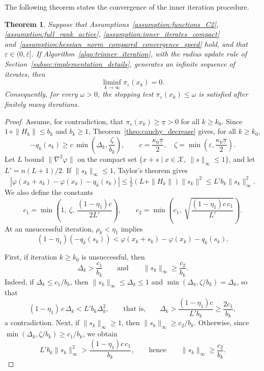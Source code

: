 \documentclass{article}
\numberwithin{equation}{section}
\newcommand{\calX}{{\mathcal{X}}}
\newcommand{\rev}[1]{#1}
\theoremstyle{plain}
\newtheorem{theorem}{Theorem}
\begin{document}
The following theorem states the convergence of the inner \rev{iteration} procedure.
\begin{theorem}\label{theo:inner_convergence}
	Suppose that Assumptions~\ref{assumption:functions_C2}, \ref{assumption:full_rank_active}, \ref{assumption:inner_iterates_compact} and~\ref{assumption:hessian_norm_compared_convergence_speed} hold, and that $\varepsilon \in (0,\bar\varepsilon]$. If Algorithm~\ref{algo:trinner_iteration}\rev{, with the radius update rule of Section~\ref{subsec:implementation_details},} generates an infinite sequence of iterates, then
	\[\liminf_{k\to\infty} \pi_\varepsilon(x_k) = 0.\]
	Consequently, for every $\omega > 0$, the stopping test $\pi_\varepsilon(x_k) \le \omega$ is satisfied after finitely many iterations.
\end{theorem}
\begin{proof}
	Assume, for contradiction, that $\pi_\varepsilon(x_k) \ge \underline{\pi} > 0$ for all $k \ge k_0$. Since $1+\|H_k\| \le b_k$ and $b_k \ge 1$, Theorem~\ref{theo:cauchy_decrease} gives, for all $k \ge k_0$,
	\begin{equation}\label{eq:decrease_bk}
		-q_k(s_k) \ge c\,\min\left(\Delta_k, \frac{\zeta}{b_k}\right), \qquad c = \frac{\kappa_0\underline{\pi}}{2}, \quad \zeta = \min\left(\varepsilon, \frac{\kappa_0\underline{\pi}}{2}\right).
	\end{equation}
	Let $L$ bound $\|\nabla^2\varphi\|$ on the compact set $\{x+s \mid x \in \calX,\ \|s\|_\infty \le 1\}$, and let $L' = n(L+1)/2$. If $\|s_k\|_\infty \le 1$, Taylor's theorem gives
	\[\left|\varphi(x_k+s_k) - \varphi(x_k) - q_k(s_k)\right| \le \tfrac{1}{2}\left(L + \|H_k\|\right)\|s_k\|^2 \le L'b_k\|s_k\|_\infty^2.\]
	We also define the constants
	\[c_1 = \min\left(1,\ \zeta,\ \frac{(1-\eta_1)c}{2L'}\right), \qquad c_2 = \min\left(c_1,\ \sqrt{\frac{(1-\eta_1)c\,c_1}{L'}}\right).\]
	At an unsuccessful iteration, $\rho_k < \eta_1$ implies
	\[(1-\eta_1)\left(-q_k(s_k)\right) < \varphi(x_k+s_k) - \varphi(x_k) - q_k(s_k).\]

	First, if iteration $k \ge k_0$ is unsuccessful, then
	\[\Delta_k > \frac{c_1}{b_k} \qquad \text{and} \qquad \|s_k\|_\infty \ge \frac{c_2}{b_k}.\]
	Indeed, if $\Delta_k \le c_1/b_k$, then $\|s_k\|_\infty \le \Delta_k \le 1$ and $\min(\Delta_k,\zeta/b_k) = \Delta_k$, so that
	\[(1-\eta_1)\,c\,\Delta_k < L'b_k\Delta_k^2, \qquad \text{that is,} \qquad \Delta_k > \frac{(1-\eta_1)c}{L'b_k} \ge \frac{2c_1}{b_k},\]
	a contradiction. Next, if $\|s_k\|_\infty \ge 1$, then $\|s_k\|_\infty \ge c_2/b_k$. Otherwise, since $\min(\Delta_k,\zeta/b_k) \ge c_1/b_k$, we obtain
	\[L'b_k\|s_k\|_\infty^2 > \frac{(1-\eta_1)c\,c_1}{b_k}, \qquad \text{hence} \qquad \|s_k\|_\infty \ge \frac{c_2}{b_k}.\]


\end{proof}
\end{document}
